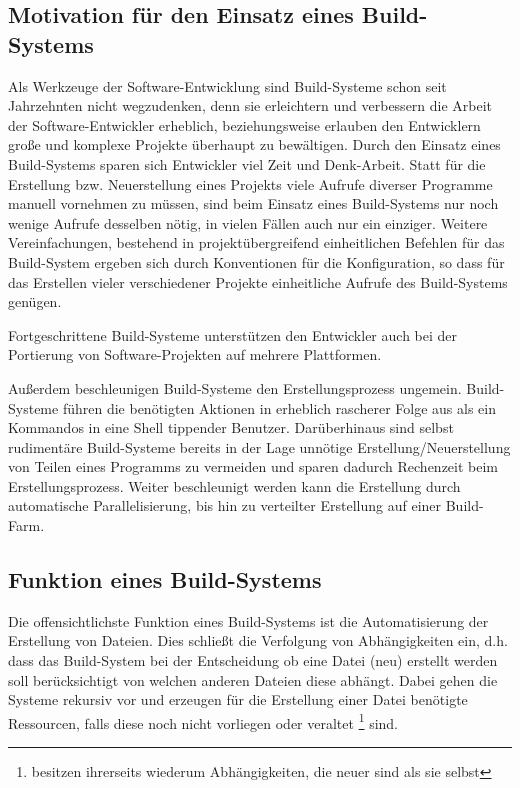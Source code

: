 \subsection{Motivation für den Einsatz eines Build-Systems} 

Als Werkzeuge der Software-Entwicklung sind Build-Systeme schon seit Jahrzehnten
nicht wegzudenken, denn sie erleichtern und verbessern die Arbeit der
Software-Entwickler erheblich, beziehungsweise erlauben den Entwicklern große
und komplexe Projekte überhaupt zu bewältigen. 
%
Durch den Einsatz eines Build-Systems sparen sich Entwickler viel Zeit und
Denk-Arbeit. Statt für die Erstellung bzw. Neuerstellung eines Projekts viele
Aufrufe diverser Programme manuell vornehmen zu müssen, sind beim Einsatz eines
Build-Systems nur noch wenige Aufrufe desselben nötig, in vielen Fällen auch
nur ein einziger.
%
Weitere Vereinfachungen, bestehend in projektübergreifend einheitlichen Befehlen
für das Build-System ergeben sich durch Konventionen für die Konfiguration, so
dass für das Erstellen vieler verschiedener Projekte einheitliche Aufrufe des
Build-Systems genügen.

Fortgeschrittene Build-Systeme unterstützen den Entwickler auch bei der
Portierung von Software-Projekten auf mehrere Plattformen. %

Außerdem beschleunigen Build-Systeme den Erstellungsprozess ungemein.
Build-Systeme führen die benötigten Aktionen in erheblich rascherer Folge aus
als ein Kommandos in eine Shell tippender Benutzer. 
%
Darüberhinaus sind selbst rudimentäre Build-Systeme bereits in der Lage unnötige
Erstellung/Neuerstellung von Teilen eines Programms zu vermeiden und sparen
dadurch Rechenzeit beim Erstellungsprozess.
%
Weiter beschleunigt werden kann die Erstellung durch automatische
Parallelisierung, bis hin zu verteilter Erstellung auf einer Build-Farm.

\subsection{Funktion eines Build-Systems}

Die offensichtlichste Funktion eines Build-Systems ist die Automatisierung der
Erstellung von Dateien. Dies schließt die Verfolgung von Abhängigkeiten ein,
d.h. dass das Build-System bei der Entscheidung ob eine Datei (neu) erstellt
werden soll berücksichtigt von welchen anderen Dateien diese abhängt.
%
Dabei gehen die Systeme rekursiv vor und erzeugen für die Erstellung einer Datei
benötigte Ressourcen, falls diese noch nicht vorliegen oder veraltet
\footnote{besitzen ihrerseits wiederum Abhängigkeiten, die neuer sind als sie
selbst} sind.

